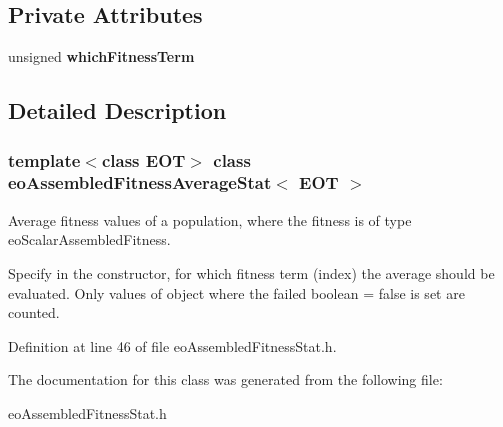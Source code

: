 \subsection*{Private Attributes}
\begin{CompactItemize}
\item 
unsigned {\bf which\-Fitness\-Term}\label{classeo_assembled_fitness_average_stat_r0}

\end{CompactItemize}


\subsection{Detailed Description}
\subsubsection*{template$<$class EOT$>$ class eo\-Assembled\-Fitness\-Average\-Stat$<$ EOT $>$}

Average fitness values of a population, where the fitness is of type eo\-Scalar\-Assembled\-Fitness. 

Specify in the constructor, for which fitness term (index) the average should be evaluated. Only values of object where the failed boolean = false is set are counted. 



Definition at line 46 of file eo\-Assembled\-Fitness\-Stat.h.

The documentation for this class was generated from the following file:\begin{CompactItemize}
\item 
eo\-Assembled\-Fitness\-Stat.h\end{CompactItemize}
